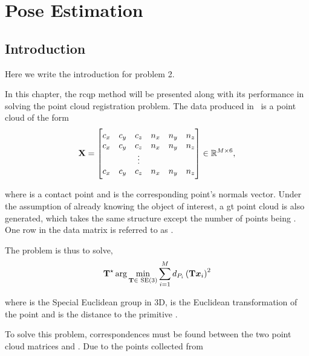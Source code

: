 \chapter{Pose Estimation} \label{ch:2-pose-estimation}

\section{Introduction} \label{sec:2-pose-estimation-introduction}
Here we write the introduction for problem 2.

In this chapter, the \gls{rcqp} method will be presented along with its performance in solving the point cloud registration problem.
The data produced in~ is a point cloud of the form
\begin{equation} \label{eq:data-matrix-structure}
	\bm{\mathrm{X}} = 
	\begin{bmatrix}
		c_x & c_y & c_z & n_x & n_y & n_z \\
		c_x & c_y & c_z & n_x & n_y & n_z \\
		 &  & \vdots &  &  &  \\
		c_x & c_y & c_z & n_x & n_y & n_z \\
	\end{bmatrix}\in\mathbb{R}^{M\times 6},
\end{equation}

where  is a contact point and  is the corresponding point's normals vector. Under the assumption of already knowing the object of interest, a \gls{gt} point cloud  is also generated, which takes the same structure except the number of points being . One row in the data matrix  is referred to as .\medskip

The problem is thus to solve,
\begin{equation} \label{eq:point-cloud-registration-problem}
	\bm{\mathrm{T}}^\star \arg \min_{\bm{\mathrm{T}}\in\text{ SE} (3)} \sum^M_{i=1} d_{P_i}\left( \bm{\mathrm{T}} \bm{x}_i \right)^2
\end{equation}

where  is the Special Euclidean group in 3D,  is the Euclidean transformation of the point  and  is the distance to the primitive .

To solve this problem, correspondences must be found between the two point cloud matrices  and . Due to the points collected from 

